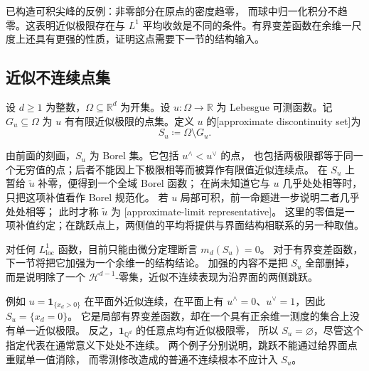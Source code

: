 \ProseParagraphBreak

已构造可积尖峰的反例：非零部分在原点的密度趋零，
而球中归一化积分不趋零。这表明近似极限存在与 \(L^1\) 平均收敛是不同的条件。有界变差函数在余维一尺度上还具有更强的性质，证明这点需要下一节的结构输入。

\subsection{近似不连续点集}
\label{b1:subsec:280103}

\begin{definition}\label{b1:def:bv-approximate-discontinuity-set}
设 \(d\ge1\) 为整数，\(\Omega\subseteq\mathbb R^d\) 为开集。设 \(u:\Omega\to\mathbb R\) 为 Lebesgue 可测函数。记 \(G_u\subseteq\Omega\) 为 \(u\) 有有限近似极限的点集。定义 \(u\) 的[approximate discontinuity set]为
\[
 S_u\coloneqq\Omega\setminus G_u.
\]
\end{definition}

由前面的刻画，\(S_u\) 为 Borel 集。它包括 \(u^\wedge<u^\vee\) 的点，
也包括两极限都等于同一个无穷值的点；后者不能因上下极限相等而被算作有限值近似连续点。
在 \(S_u\) 上暂给 \(\widetilde u\) 补零，便得到一个全域 Borel 函数；
在尚未知道它与 \(u\) 几乎处处相等时，只把这项补值看作 Borel 规范化。
若 \(u\) 局部可积，前一命题进一步说明二者几乎处处相等；
此时才称 \(\widetilde u\) 为
[approximate-limit representative]。
这里的零值是一项补值约定；在跳跃点上，两侧值的平均将提供与界面结构相联系的另一种取值。

\ProseParagraphBreak

对任何 \(L^1_{\mathrm{loc}}\) 函数，目前只能由微分定理断言 \(m_d(S_u)=0\)。
对于有界变差函数，下一节将把它加强为一个余维一的结构结论。
加强的内容不是把 \(S_u\) 全部删掉，而是说明除了一个
\(\mathcal H^{d-1}\)-零集，近似不连续表现为沿界面的两侧跳跃。

\ProseParagraphBreak

例如 \(u=\mathbf1_{\{x_d>0\}}\) 在平面外近似连续，在平面上有
\(u^\wedge=0\)、\(u^\vee=1\)，因此 \(S_u=\{x_d=0\}\)。
它是局部有界变差函数，却在一个具有正余维一测度的集合上没有单一近似极限。
反之，\(\mathbf1_{\mathbb Q^d}\) 的任意点均有近似极限零，
所以 \(S_u=\varnothing\)，尽管这个指定代表在通常意义下处处不连续。
两个例子分别说明，跳跃不能通过给界面点重赋单一值消除，
而零测修改造成的普通不连续根本不应计入 \(S_u\)。

